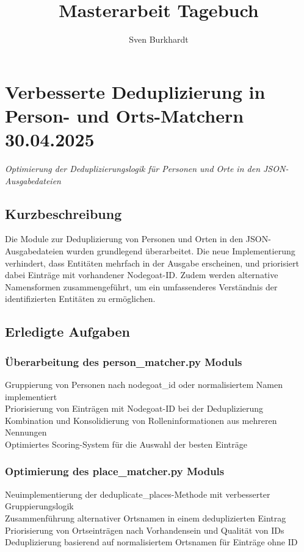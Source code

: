 \documentclass{article}
\title{\Huge Masterarbeit Tagebuch}
\author{Sven Burkhardt}
\date{}
\begin{document}
\maketitle
\noindent
\hrulefill

\newpage %
\tableofcontents


\noindent\hrulefill

\section{Verbesserte Deduplizierung in Person- und Orts-Matchern \small 30.04.2025}
\small\textit{Optimierung der Deduplizierungslogik für Personen und Orte in den JSON-Ausgabedateien}\\

\subsection*{Kurzbeschreibung}
Die Module zur Deduplizierung von Personen und Orten in den JSON-Ausgabedateien wurden grundlegend überarbeitet. Die neue Implementierung verhindert, dass Entitäten mehrfach in der Ausgabe erscheinen, und priorisiert dabei Einträge mit vorhandener Nodegoat-ID. Zudem werden alternative Namensformen zusammengeführt, um ein umfassenderes Verständnis der identifizierten Entitäten zu ermöglichen.

\subsection*{Erledigte Aufgaben}
\subsubsection*{\small Überarbeitung des person\_matcher.py Moduls}
 Gruppierung von Personen nach nodegoat\_id oder normalisiertem Namen implementiert\\
 Priorisierung von Einträgen mit Nodegoat-ID bei der Deduplizierung\\
 Kombination und Konsolidierung von Rolleninformationen aus mehreren Nennungen\\
 Optimiertes Scoring-System für die Auswahl der besten Einträge

\subsubsection*{\small Optimierung des place\_matcher.py Moduls}
 Neuimplementierung der deduplicate\_places-Methode mit verbesserter Gruppierungslogik\\
 Zusammenführung alternativer Ortsnamen in einem deduplizierten Eintrag\\
 Priorisierung von Ortseinträgen nach Vorhandensein und Qualität von IDs\\
 Deduplizierung basierend auf normalisiertem Ortsnamen für Einträge ohne ID
\end{document}
